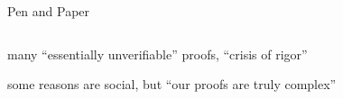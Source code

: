 \begin{frame}[T]{Pen and Paper}
\begin{columns}[fullwidth,t]
\begin{column}{.68\linewidth}
\begin{description}[]
\item[{Bellare and Rogaway: [BR06]}]\leavevmode\newline many \enquote{essentially unverifiable} proofs, \enquote{crisis of rigor}

\item[{Halevi: [Hal05]}]\leavevmode\newline
	some reasons are social,
but \enquote{our proofs are truly complex}



\end{description}
    \end{column}
  \end{columns}
\end{frame}


